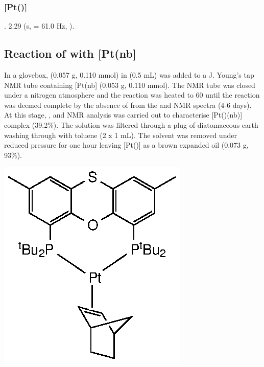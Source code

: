 \subsubsection{[Pt(\Phthixantphos)]}

.
2.29 (s, \JPtH{} = 61.0 Hz, ).
 
\subsection*{Reaction of \tButhixantphos{} with \texorpdfstring{[Pt(nb]} P} 

In a glovebox, \tBuThixantphos{} (0.057 g, 0.110 mmol) in  (0.5 mL) was added to a J. Young's tap NMR tube containing [Pt(nb] (0.053 g, 0.110 mmol).  The NMR tube was closed under a nitrogen atmosphere and the reaction was heated to 60 \degC{} until the reaction was deemed complete by the absence of \tBuThixantphos{} from the \phosphorus{} and \proton{} NMR spectra (4-6 days).  At this stage, \proton{}, \carbon{} and \phosphorus{} NMR analysis was carried out to characterise [Pt(\tButhixantphos)(nb)] complex (39.2\%).  The solution was filtered through a plug of diatomaceous earth washing through with toluene (2 x 1 mL).  The solvent was removed under reduced pressure for one hour leaving [Pt(\tButhixantphos)] as a brown expanded oil (0.073 g, 93\%).

\begin{structure}[h]
\begin{center}
\includegraphics{../Structures/StBuPlatinumnorbornene.eps}
\end{center}
\end{structure}


